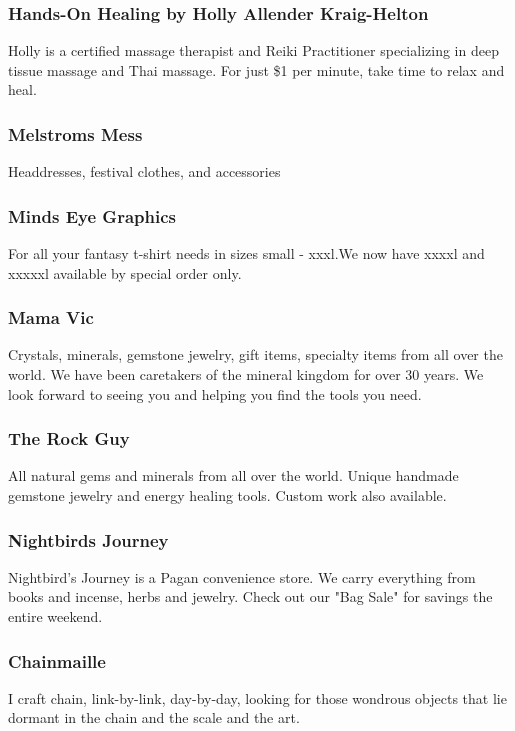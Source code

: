 

\subsubsection{Hands-On Healing by Holly Allender Kraig-Helton} { \small Holly is a certified massage therapist and Reiki Practitioner specializing in deep tissue massage and Thai massage. For just \$1 per minute, take time to relax and heal.  } 

\subsubsection{Melstroms Mess} { \small Headdresses, festival clothes, and accessories } 

\subsubsection{Minds Eye Graphics} { \small For all your fantasy t-shirt needs in sizes small - xxxl.We now have xxxxl and xxxxxl available by special order only. } 

\subsubsection{Mama Vic} { \small Crystals, minerals, gemstone jewelry, gift items, specialty items from all over the world.  We have been caretakers of the mineral kingdom for over 30 years.  We look forward to seeing you and helping you find the tools you need. } 

\subsubsection{The Rock Guy} { \small All natural gems and minerals from all over the world. Unique handmade gemstone jewelry and energy healing tools. Custom work also available. } 

\subsubsection{Nightbirds Journey} { \small Nightbird's Journey is a Pagan convenience store.  We carry everything from books and incense, herbs and jewelry.  Check out our "Bag Sale" for savings the entire weekend. } 

\subsubsection{Chainmaille} { \small I craft chain, link-by-link, day-by-day, looking for those wondrous objects that lie dormant in the chain and the scale and the art. } 

